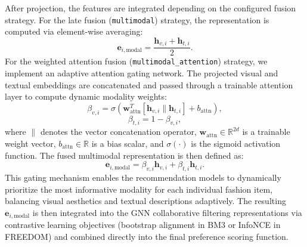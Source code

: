 After projection, the features are integrated depending on the configured fusion strategy. For the late fusion (\texttt{multimodal}) strategy, the representation is computed via element-wise averaging:
\begin{equation}
    \mathbf{e}_{i, \text{modal}} = \frac{\mathbf{h}_{v,i} + \mathbf{h}_{t,i}}{2}.
\end{equation}
For the weighted attention fusion (\texttt{multimodal\_attention}) strategy, we implement an adaptive attention gating network. The projected visual and textual embeddings are concatenated and passed through a trainable attention layer to compute dynamic modality weights:
\begin{equation}
    \beta_{v,i} = \sigma\left(\mathbf{w}_{\text{attn}}^{T} [\mathbf{h}_{v,i} \parallel \mathbf{h}_{t,i}] + b_{\text{attn}}\right),
\end{equation}
\begin{equation}
    \beta_{t,i} = 1 - \beta_{v,i},
\end{equation}
where $\parallel$ denotes the vector concatenation operator, $\mathbf{w}_{\text{attn}} \in \mathbb{R}^{2d}$ is a trainable weight vector, $b_{\text{attn}} \in \mathbb{R}$ is a bias scalar, and $\sigma(\cdot)$ is the sigmoid activation function. The fused multimodal representation is then defined as:
\begin{equation}
    \mathbf{e}_{i, \text{modal}} = \beta_{v,i} \mathbf{h}_{v,i} + \beta_{t,i} \mathbf{h}_{t,i}.
\end{equation}
This gating mechanism enables the recommendation models to dynamically prioritize the most informative modality for each individual fashion item, balancing visual aesthetics and textual descriptions adaptively. The resulting $\mathbf{e}_{i, \text{modal}}$ is then integrated into the GNN collaborative filtering representations via contrastive learning objectives (bootstrap alignment in BM3 or InfoNCE in FREEDOM) and combined directly into the final preference scoring function.
